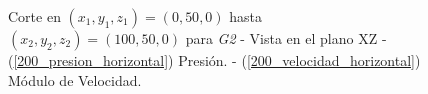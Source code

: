 \documentclass[10pt,a4paper,final]{article}
\begin{document}
%
%
\begin{figure}[H]
   \centering
   \hspace{0.1\linewidth}
    \caption{Corte en $(x_1,y_1,z_1)=(0,50,0)$ hasta $(x_2,y_2,z_2)=(100,50,0)$ para \emph{G2} - Vista en el plano XZ - (\ref{200_presion_horizontal}) Presión. - (\ref{200_velocidad_horizontal}) Módulo de Velocidad.}
   \label{200_velocidad_presion_horizontal}                %
\end{figure}
%
%
\end{document}
